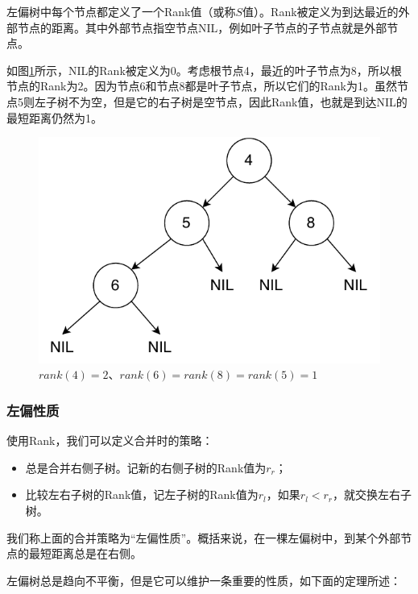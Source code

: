 \documentclass[b5paper]{ctexart}
\begin{document}
左偏树中每个节点都定义了一个Rank值（或称$S$值）。Rank被定义为到达最近的外部节点的距离。其中外部节点指空节点NIL，例如叶子节点的子节点就是外部节点。

如图\ref{fig:rank}所示，NIL的Rank被定义为0。考虑根节点4，最近的叶子节点为8，所以根节点的Rank为2。因为节点6和节点8都是叶子节点，所以它们的Rank为1。虽然节点5则左子树不为空，但是它的右子树是空节点，因此Rank值，也就是到达NIL的最短距离仍然为1。

\begin{figure}[htbp]
   \begin{center}
     \includegraphics[scale=0.5]{img/rank}
     \caption{$rank(4) = 2$、$rank(6) = rank(8) = rank(5) = 1$} \label{fig:rank}
   \end{center}
\end{figure}

\subsubsection{左偏性质}

使用Rank，我们可以定义合并时的策略：

\begin{itemize}
\item 总是合并右侧子树。记新的右侧子树的Rank值为$r_r$；
\item 比较左右子树的Rank值，记左子树的Rank值为$r_l$，如果$r_l < r_r$，就交换左右子树。
\end{itemize}

我们称上面的合并策略为“左偏性质”。概括来说，在一棵左偏树中，到某个外部节点的最短距离总是在右侧。

左偏树总是趋向不平衡，但是它可以维护一条重要的性质，如下面的定理所述：
\end{document}
